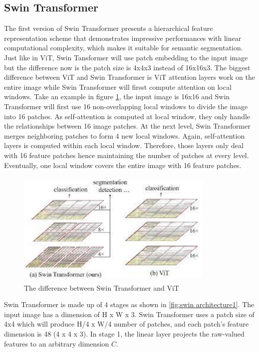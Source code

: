 \subsection{Swin Transformer}
The first version of Swin Transformer \cite{swin-v1} presents a hierarchical feature representation scheme that demonstrates impressive performances with linear computational complexity, which makes it suitable for semantic segmentation. Just like in ViT, Swin Tansformer will use patch embedding to the input image but the difference now is the patch size is 4x4x3 instead of 16x16x3. The biggest difference between ViT and Swin Transformer is ViT attention layers work on the entire image while Swin Transformer will firsst compute attention on local windows. Take an example in figure \ref{fig:swin-vs-vit}, the input image is 16x16 and Swin Transformer will first use 16 non-overlapping local windows to divide the image into 16 patches. As self-attention is computed at local window, they only handle the relationships between 16 image patches. At the next level, Swin Transformer merges neighboring patches to form 4 new local windows. Again, self-attention layers is computed within each local window. Therefore, those layers only deal with 16 feature patches hence maintaining the number of patches at every level. Eventually, one local window covers the entire image with 16 feature patches.
\FloatBarrier
\begin{figure}[ht]
\includegraphics[width=9.5cm, height=5.5cm]{images/swin vs vit.png}
\centering
\caption{The difference between Swin Transformer and ViT \protect\cite{swin-v1}}
\label{fig:swin-vs-vit}
\end{figure}

Swin Transformer is made up of 4 stages as shown in \ref{fig:swin architecture1}. The input image has a dimension of H x W x 3. Swin Transformer uses a patch size of 4x4 which will produce H/4 x W/4 number of patches, and each patch’s feature dimension is 48 (4 x 4 x 3). In stage 1, the linear layer projects the raw-valued features to an arbitrary dimension $C$.

